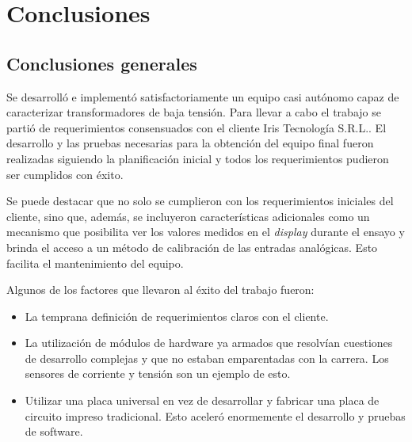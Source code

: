 
\chapter{Conclusiones} %

\label{Chapter5} %




\section{Conclusiones generales }

Se desarrolló e implementó satisfactoriamente un equipo casi autónomo capaz de caracterizar transformadores de baja tensión. Para llevar a cabo el trabajo se partió de requerimientos consensuados con el cliente Iris Tecnología S.R.L.. El desarrollo y las pruebas necesarias para la obtención del equipo final fueron realizadas siguiendo la planificación inicial y todos los requerimientos pudieron ser cumplidos con éxito.

Se puede destacar que no solo se cumplieron con los requerimientos iniciales del cliente, sino que, además, se incluyeron características adicionales como un mecanismo que posibilita ver los valores medidos en el \textit{display} durante el ensayo y brinda el acceso a un método de calibración de las entradas analógicas. Esto facilita el mantenimiento del equipo.

Algunos de los factores que llevaron al éxito del trabajo fueron:
\begin{itemize}
\item La temprana definición de requerimientos claros con el cliente.
\item La utilización de módulos de hardware ya armados que resolvían cuestiones de desarrollo complejas y que no estaban emparentadas con la carrera. Los sensores de corriente y tensión son un ejemplo de esto.
\item Utilizar una placa universal en vez de desarrollar y fabricar una placa de circuito impreso tradicional. Esto aceleró enormemente el desarrollo y pruebas de software.
\end{itemize}

